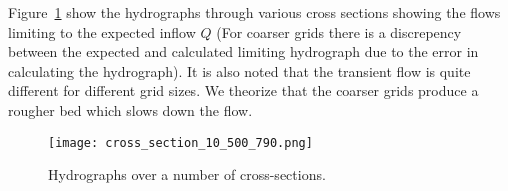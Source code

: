 Figure~\ref{fig:hydrographs} show the hydrographs through various cross sections showing the flows limiting to the 
expected inflow $Q$ (For coarser grids there is a discrepency between the expected and calculated limiting 
hydrograph due to the error in calculating the hydrograph). It is also noted that the transient flow is quite different 
for different grid sizes. We theorize that the coarser grids produce a rougher bed which slows down the flow. 

\begin{figure}
\begin{center}
\texttt{[image: cross\_section\_10\_500\_790.png]}
\caption{Hydrographs over a number of cross-sections.}
\label{fig:hydrographs}
\end{center}
\end{figure}




\endinput
